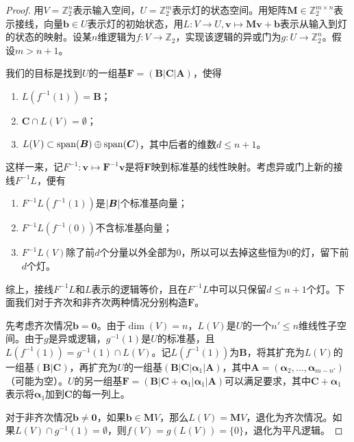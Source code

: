 \begin{proof}
  用$V=\mathbb{Z}_2^n$表示输入空间，$U=\mathbb{Z}_2^m$表示灯的状态空间。用矩阵$\boldsymbol{M}\in\mathbb{Z}_2^{m\times n}$表示接线，向量$\boldsymbol{b}\in U$表示灯的初始状态，用$L:V\to U, \boldsymbol{v}\mapsto \boldsymbol{M}\boldsymbol{v}+\boldsymbol{b}$表示从输入到灯的状态的映射。设某$n$维逻辑为$f:V\to\mathbb{Z}_2$，实现该逻辑的异或门为$g:U\to \mathbb{Z}_2^n$。假设$m>n+1$。

  我们的目标是找到$U$的一组基$\boldsymbol{F}=(\boldsymbol{B}|\boldsymbol{C}|\boldsymbol{A})$，使得
  \begin{enumerate}
    \item $L(f^{-1}(1))=\boldsymbol{B}$；
    \item $\boldsymbol{C}\cap L(V)=\emptyset$；
    \item $L(V) \subset \operatorname{span}(\boldsymbol{B})\oplus\operatorname{span}(\boldsymbol{C})$，其中后者的维数$d\le n+1$。
  \end{enumerate}
  这样一来，记$F^{-1}:\boldsymbol{v}\mapsto\boldsymbol{F}^{-1}\boldsymbol{v}$是将$\boldsymbol{F}$映到标准基的线性映射。考虑异或门上新的接线$F^{-1}L$，便有
  \begin{enumerate}
    \item $F^{-1}L(f^{-1}(1))$是$\left\lvert{\boldsymbol{B}}\right\rvert$个标准基向量；
    \item $F^{-1}L(f^{-1}(0))$不含标准基向量；
    \item $F^{-1}L(V)$除了前$d$个分量以外全部为0，所以可以去掉这些恒为0的灯，留下前$d$个灯。
  \end{enumerate}
  综上，接线$F^{-1}L$和$L$表示的逻辑等价，且在$F^{-1}L$中可以只保留$d\le n+1$个灯。下面我们对于齐次和非齐次两种情况分别构造$\boldsymbol{F}$。

  先考虑齐次情况$\boldsymbol{b}=\boldsymbol{0}$。由于$\dim(V)=n$，$L(V)$是$U$的一个$n'\le n$维线性子空间。由于$g$是异或逻辑，$g^{-1}(1)$是$U$的标准基，且$L(f^{-1}(1))=g^{-1}(1)\cap L(V)$。记$L(f^{-1}(1))$为$\boldsymbol{B}$，将其扩充为$L(V)$的一组基$(\boldsymbol{B}|\boldsymbol{C})$，再扩充为$U$的一组基$(\boldsymbol{B}|\boldsymbol{C}|\boldsymbol{\alpha}_1|\boldsymbol{A})$，其中$\boldsymbol{A}=(\boldsymbol{\alpha}_2,\dots,\boldsymbol{\alpha}_{m-n'})$（可能为空）。$U$的另一组基$\boldsymbol{F}=(\boldsymbol{B}|\boldsymbol{C}+\boldsymbol{\alpha}_1|\boldsymbol{\alpha}_1|\boldsymbol{A})$可以满足要求，其中$\boldsymbol{C}+\boldsymbol{\alpha}_1$表示将$\boldsymbol{\alpha}_1$加到$\boldsymbol{C}$的每一列上。

  对于非齐次情况$\boldsymbol{b}\ne\boldsymbol{0}$，如果$\boldsymbol{b}\in \boldsymbol{M}V$，那么$L(V)=\boldsymbol{M}V$，退化为齐次情况。如果$L(V)\cap g^{-1}(1)=\emptyset$，则$f(V)=g(L(V))=\{0\}$，退化为平凡逻辑。


\end{proof}
